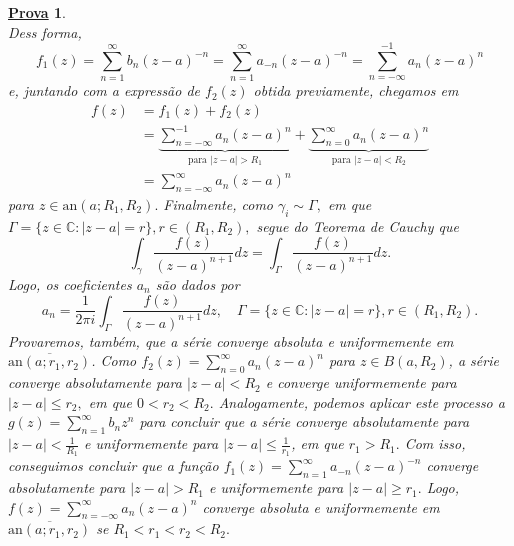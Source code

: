 \documentclass{article}
\newtheorem*{proof*}{\underline{Prova}}
\begin{document}
\begin{proof*}
\[    \]
    Dess forma,
    \[
      f_{1}(z) = \sum\limits_{n=1}^{\infty}b_{n}(z-a)^{-n}=\sum\limits_{n=1}^{\infty}a_{-n}(z-a)^{-n}=\sum\limits_{n=-\infty}^{-1}a_{n}(z-a)^{n}
    \]
    e, juntando com a expressão de \(f_{2}(z)\) obtida previamente, chegamos em 
    \begin{align*}
      f(z)&= f_{1}(z) + f_{2}(z)\\
          &= \underbrace{\sum\limits_{n=-\infty}^{-1}a_{n}(z-a)^{n}}_{\text{para }|z-a|>R_{1}} + \underbrace{\sum\limits_{n=0}^{\infty}a_{n}(z-a)^{n}}_{\text{para }|z-a| < R_{2}}\\
          &= \sum\limits_{n=-\infty}^{\infty}a_{n}(z-a)^{n}
    \end{align*}
    para \(z\in \mathrm{an}(a; R_{1}, R_{2}).\) Finalmente, como \(\gamma_{i}\sim\Gamma ,\) em que \(\Gamma =\{z\in \mathbb{C}:|z-a| = r\}, r\in (R_{1}, R_{2}),\) segue
    do Teorema de Cauchy que 
    \[
      \int_{\gamma }^{}\frac{f(z)}{(z-a)^{n+1}}dz = \int_{\Gamma }^{}\frac{f(z)}{(z-a)^{n+1}}dz.
    \]
    Logo, os coeficientes \(a_{n}\) são dados por 
    \[
      a_{n} = \frac{1}{2\pi i}\int_{\Gamma }^{}\frac{f(z)}{(z-a)^{n+1}}dz,\quad \Gamma = \{z\in \mathbb{C}:|z-a|=r\},r\in(R_{1},R_{2}).
    \]
    Provaremos, também, que a série converge absoluta e uniformemente em \(\overline{\mathrm{an}(a; r_{1}, r_{2})}\). Como \(f_2(z) = \sum\limits_{n=0}^{\infty}a_{n}(z-a)^{n}\) para \(z\in B(a, R_{2})\),
a série converge absolutamente para \(|z-a| < R_{2}\) e converge uniformemente para \(|z-a|\leq r_{2},\) em que \(0 < r_{2} < R_{2}.\)
Analogamente, podemos aplicar este processo a \(g(z) = \sum\limits_{n=1}^{\infty}b_{n}z^{n}\) para concluir que a série converge absolutamente para
 \(|z-a| < \frac{1}{R_{1}}\) e uniformemente para \(|z-a|\leq \frac{1}{r_{1}}\), em que \(r_{1} > R_{1}.\) Com isso, conseguimos concluir que a função
 \(f_{1}(z) = \sum\limits_{n=1}^{\infty}a_{-n}(z-a)^{-n}\) converge absolutamente para \(|z-a| > R_{1}\) e uniformemente para \(|z-a| \geq r_{1}.\) Logo,
  \(f(z) = \sum\limits_{n=-\infty}^{\infty}a_{n}(z-a)^{n}\) converge absoluta e uniformemente em \(\overline{\mathrm{an}(a; r_{1}, r_{2})}\) se \(R_{1} < r_{1} < r_{2} < R_{2}.\)


\end{proof*}
\end{document}
